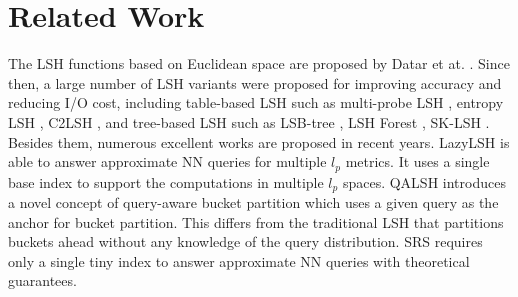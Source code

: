 \section{Related Work}
\label{sec:related}

 The LSH functions based on Euclidean space are proposed by Datar et at. \cite{datar}. Since then, a large number of LSH variants were proposed for improving accuracy and reducing I/O cost, including table-based LSH such as multi-probe LSH \cite{mplsh}, entropy LSH \cite{Panigrahy:2006:EBN:1109557.1109688}, C2LSH \cite{c2lsh}, and tree-based LSH such as LSB-tree \cite{lsb}, LSH Forest \cite{Bawa:2005:LFS:1060745.1060840}, SK-LSH \cite{sklsh}. Besides them, numerous excellent works are proposed in recent years. LazyLSH \cite{Zheng:2016:LAN:2882903.2882930} is able to answer approximate NN queries for multiple $l_p$ metrics. It uses a single base index to support the computations in multiple $l_p$ spaces. QALSH \cite{Huang:2015:QLH:2850469.2850470} introduces a novel concept of query-aware bucket partition which uses a given query as the anchor for bucket partition. This differs from the traditional LSH that partitions buckets ahead without any knowledge of the query distribution. SRS \cite{srs} requires only a single tiny index to answer approximate NN queries with theoretical guarantees.



